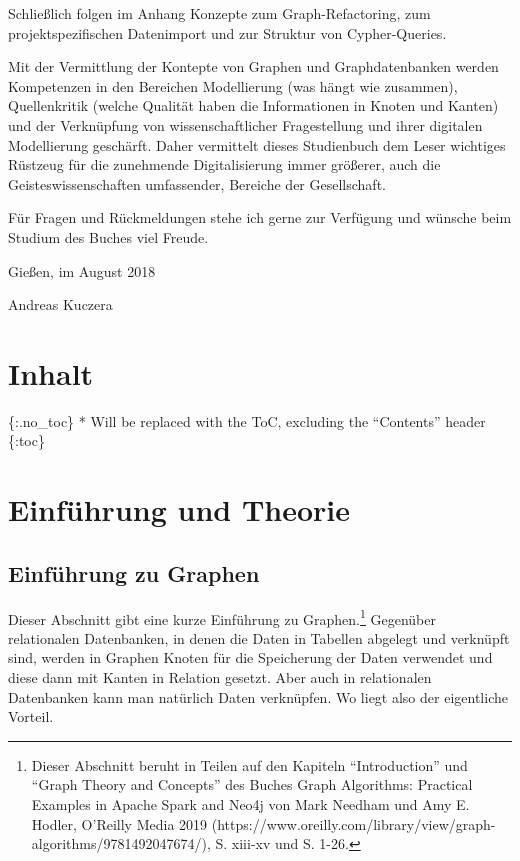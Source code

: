 \documentclass[ngerman,]{scrreprt}
\begin{document}
Schließlich folgen im Anhang Konzepte zum Graph-Refactoring, zum projektspezifischen Datenimport und zur Struktur von Cypher-Queries.

Mit der Vermittlung der Kontepte von Graphen und Graphdatenbanken werden Kompetenzen in den Bereichen Modellierung (was hängt wie zusammen), Quellenkritik (welche Qualität haben die Informationen in Knoten und Kanten) und der Verknüpfung von wissenschaftlicher Fragestellung und ihrer digitalen Modellierung geschärft. Daher vermittelt dieses Studienbuch dem Leser wichtiges Rüstzeug für die zunehmende Digitalisierung immer größerer, auch die Geisteswissenschaften umfassender, Bereiche der Gesellschaft.

Für Fragen und Rückmeldungen stehe ich gerne zur Verfügung und wünsche beim Studium des Buches viel Freude.

Gießen, im August 2018

Andreas Kuczera

\chapter{Inhalt}\label{inhalt-1}

\{:.no\_toc\} * Will be replaced with the ToC, excluding the ``Contents'' header \{:toc\}

\chapter{Einführung und Theorie}\label{einfuxfchrung-und-theorie}

\section{Einführung zu Graphen}\label{einfuxfchrung-zu-graphen}

Dieser Abschnitt gibt eine kurze Einführung zu Graphen.\footnote{Dieser Abschnitt beruht in Teilen auf den Kapiteln ``Introduction'' und ``Graph Theory and Concepts'' des Buches Graph Algorithms: Practical Examples in Apache Spark and Neo4j von Mark Needham und Amy E. Hodler, O'Reilly Media 2019 (https://www.oreilly.com/library/view/graph-algorithms/9781492047674/), S. xiii-xv und S. 1-26.} Gegenüber relationalen Datenbanken, in denen die Daten in Tabellen abgelegt und verknüpft sind, werden in Graphen Knoten für die Speicherung der Daten verwendet und diese dann mit Kanten in Relation gesetzt. Aber auch in relationalen Datenbanken kann man natürlich Daten verknüpfen. Wo liegt also der eigentliche Vorteil.
\end{document}
